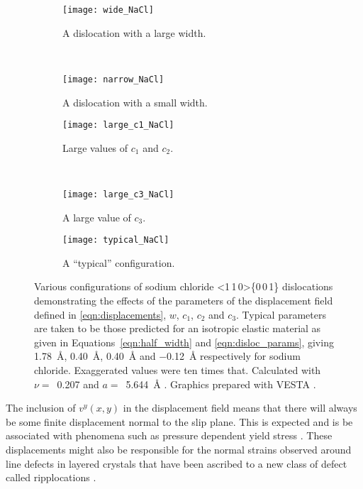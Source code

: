 \begin{figure}
\centering

    \begin{subfigure}{0.4\textwidth}
    \centering
    \texttt{[image: wide\_NaCl]}
    \caption{A dislocation with a large width.}
    \end{subfigure}
    ~
    \begin{subfigure}{0.4\textwidth}
    \centering
    \texttt{[image: narrow\_NaCl]}
    \caption{A dislocation with a small width.}
    \end{subfigure}

	\begin{subfigure}{0.4\textwidth}
	\centering
    \texttt{[image: large\_c1\_NaCl]}
    \caption{Large values of $c_1$ and $c_2$.}
	\end{subfigure}
    ~
	\begin{subfigure}{0.4\textwidth}
	\centering
    \texttt{[image: large\_c3\_NaCl]}
    \caption{A large value of $c_3$.}
	\end{subfigure}

    \begin{subfigure}{0.8\textwidth}
    \centering
    \texttt{[image: typical\_NaCl]}
    \caption{A ``typical'' configuration.}
    \end{subfigure}

\captionsetup{width=0.8\textwidth}
\caption[The displacement field around an edge dislocation in rock salt.]{Various configurations of sodium chloride <1\,1\,0>\{0\,0\,1\} dislocations demonstrating the effects of the parameters of the displacement field defined in \autoref{eqn:displacements}, $w$, $c_1$, $c_2$ and $c_3$. Typical parameters are taken to be those predicted for an isotropic elastic material as given in  Equations~\ref{eqn:half_width} and \ref{eqn:disloc_params}, giving \SI{1.78}{\angstrom}, \SI{0.40}{\angstrom}, \SI{0.40}{\angstrom} and \SI{-0.12}{\angstrom} respectively for sodium chloride. Exaggerated values were ten times that. Calculated with $\nu =$~\num{0.207} and $a =$~\SI{5.644}{\angstrom} \cite{Theocaris1994,Rao1990}. Graphics prepared with VESTA \cite{Momma2011}.\label{fig:parameters_of_the_disloc_configuration}}
\end{figure}


The inclusion of $v^y(x,y)$ in the displacement field means that there will always be some finite displacement normal to the slip plane. This is expected and is be associated with phenomena such as pressure dependent yield stress \cite{frost1982pressure}. These displacements might also be responsible for the normal strains observed around line defects in layered crystals that have been ascribed to  a new class of defect called ripplocations \cite{Gruber2016}.




